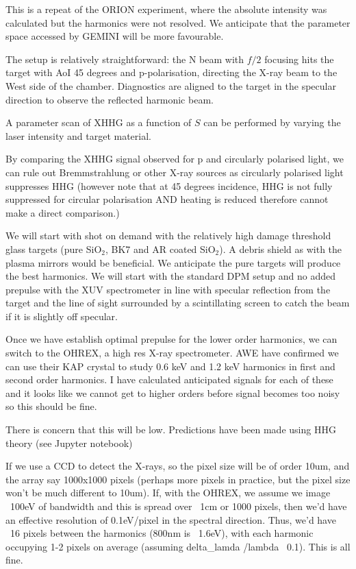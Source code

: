 This is a repeat of the ORION experiment, where the absolute intensity was calculated but the harmonics were not resolved. We anticipate that the parameter space accessed by GEMINI will be more favourable.

The setup is relatively straightforward: the N beam with $f/2$ focusing hits the target with AoI 45 degrees and p-polarisation, directing the X-ray beam to the West side of the chamber. Diagnostics are aligned to the target in the specular direction to observe the reflected harmonic beam.

A parameter scan of XHHG as a function of $S$ can be performed by varying the laser intensity and target material.

By comparing the XHHG signal observed for p and circularly polarised light, we can rule out Bremmstrahlung or other X-ray sources as circularly polarised light suppresses HHG (however note that at 45 degrees incidence, HHG is not fully suppressed for circular polarisation AND heating is reduced therefore cannot make a direct comparison.)


We will start with shot on demand with the relatively high damage threshold glass targets (pure SiO$_2$, BK7 and AR coated SiO$_2$). A debris shield as with the plasma mirrors would be beneficial. We anticipate the pure targets will produce the best harmonics. We will start with the standard DPM setup and no added prepulse with the XUV spectrometer in line with specular reflection from the target and the line of sight surrounded by a scintillating screen to catch the beam if it is slightly off specular. 

Once we have establish optimal prepulse for the lower order harmonics, we can switch to the OHREX, a high res X-ray spectrometer. AWE have confirmed we can use their KAP crystal to study 0.6 keV and 1.2 keV harmonics in first and second order harmonics. I have calculated anticipated signals for each of these and it looks like we cannot get to higher orders before signal becomes too noisy so this should be fine.

There is concern that this will be low. Predictions have been made using HHG theory (see Jupyter notebook)

If we use a CCD to detect the X-rays, so the pixel size will be of order 10um, and the array say 1000x1000 pixels (perhaps more pixels in practice, but the pixel size won’t be much different to 10um).
If, with the OHREX, we assume we image ~100eV of bandwidth and this is spread over ~1cm or 1000 pixels, then we’d have an effective resolution of 0.1eV/pixel in the spectral direction. Thus, we’d have ~16 pixels between the harmonics (800nm is ~1.6eV), with each harmonic occupying 1-2 pixels on average (assuming delta_lamda /lambda ~0.1). This is all fine.

